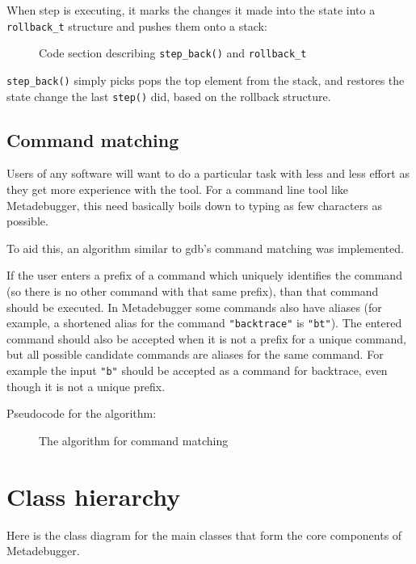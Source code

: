 When step is executing, it marks the changes it made into the state into a
\texttt{rollback\_t} structure and pushes them onto a stack:

\begin{figure}[H]
    \caption{Code section describing \texttt{step\_back()} and
        \texttt{rollback\_t}
    }
\end{figure}

\noindent
\texttt{step\_back()} simply picks pops the top element from the stack, and
restores the state change the last \texttt{step()} did, based on the
rollback structure.

\subsection{Command matching}

Users of any software will want to do a particular task with less and less
effort as they get more experience with the tool. For a command line tool like
Metadebugger, this need basically boils down to typing as few characters as
possible.

To aid this, an algorithm similar to gdb's command matching was implemented.

If the user enters a prefix of a command which uniquely identifies the command
(so there is no other command with that same prefix), than that command should
be executed. In Metadebugger some commands also have aliases (for example, a
shortened alias for the command \texttt{"backtrace"} is \texttt{"bt"}). The
entered command should also be accepted when it is not a prefix for a unique
command, but all possible candidate commands are aliases for the same command.
For example the input \texttt{"b"} should be accepted as a command for
backtrace, even though it is not a unique prefix.

Pseudocode for the algorithm:

\begin{figure}[H]
    \caption{The algorithm for command matching}
\end{figure}

\pagebreak

\section{Class hierarchy}

Here is the class diagram for the main classes that form the core components of
Metadebugger.

